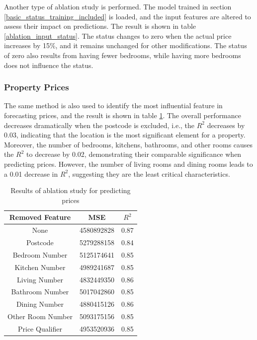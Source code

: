 \documentclass[12pt,twoside]{report}
\begin{document}
Another type of ablation study is performed. The model trained in section \ref{basic_status_training_included} is loaded, and the input features are altered to assess their impact on predictions. The result is shown in table \ref{ablation_input_status}. The status changes to zero when the actual price increases by 15\%, and it remains unchanged for other modifications. The status of zero also results from having fewer bedrooms, while having more bedrooms does not influence the status.

\subsubsection{Property Prices}
The same method is also used to identify the most influential feature in forecasting prices, and the result is shown in table \ref{ablation_price}. The overall performance decreases dramatically when the postcode is excluded, i.e., the $R^2$ decreases by 0.03, indicating that the location is the most significant element for a property. Moreover, the number of bedrooms, kitchens, bathrooms, and other rooms causes the $R^2$ to decrease by 0.02, demonstrating their comparable significance when predicting prices. However, the number of living rooms and dining rooms leads to a 0.01 decrease in $R^2$, suggesting they are the least critical characteristics. 

\begin{table}[H]
	\centering
	\caption{Results of ablation study for predicting prices}
	\label{ablation_price}
	\begin{tabular}{| c | c | c |}
		\hline
		Removed Feature & MSE & $R^2$ \\
		\hline
		None & 4580892828 & 0.87 \\
		\hline
		Postcode & 5279288158 & 0.84 \\
		\hline
		Bedroom Number & 5125174641 & 0.85 \\
		\hline
		Kitchen Number & 4989241687 & 0.85 \\
		\hline
		Living Number & 4832449350 & 0.86 \\
		\hline
		Bathroom Number & 5017042860 & 0.85 \\
		\hline
		Dining Number & 4880415126 & 0.86 \\
		\hline
		Other Room Number & 5093175156 & 0.85 \\
		\hline
		Price Qualifier & 4953520936 & 0.85 \\
		\hline
	\end{tabular}
\end{table}
\end{document}
